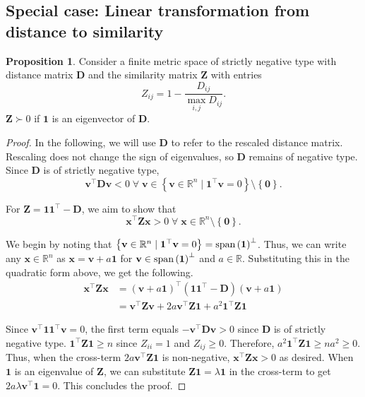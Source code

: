 \documentclass[aps,pre,floats,floatfix,superscriptaddress,twocolumn,final,10pt]{revtex4-2}
\theoremstyle{definition}
\newtheorem{proposition}{Proposition}
\renewcommand{\vec}[1]{\mathbf{#1}}
\begin{document}
\subsection{Special case: Linear transformation from distance to similarity}
\begin{proposition}
    Consider a finite metric space of strictly negative type with distance matrix $\vec{D}$ and the similarity matrix $\vec{Z}$ with entries 
    \begin{equation*}
        Z_{ij}=1-\frac{D_{ij}}{\max_{i,j}D_{ij}}.
    \end{equation*}
    $\vec{Z} \succ 0$ if $\vec{1}$ is an eigenvector of $\vec{D}$.
\label{prop:1-d}
\end{proposition}
\begin{proof}
In the following, we will use $\vec{D}$ to refer to the rescaled distance matrix. Rescaling does not change the sign of eigenvalues, so $\vec{D}$ remains of negative type. Since $\vec{D}$ is of strictly negative type,
\begin{equation}
    \vec{v}^\top \vec{Dv} < 0 \; \forall \; \vec{v} \in \left\{ \vec{v} \in \mathbb{R}^n \mid \vec{1}^\top\vec{v}=0 \right\} \setminus \left\{ \vec{0}\right\}.
\end{equation}

For $\vec{Z}=\vec{11}^\top - \vec{D}$, we aim to show that
\begin{equation}
    \vec{x}^\top \vec{Zx} > 0 \; \forall\; \vec{x} \in \mathbb{R}^n \setminus \left\{\vec{0}\right\}.
\end{equation}

We begin by noting that $\left\{ \vec{v} \in \mathbb{R}^n \mid \vec{1}^\top\vec{v}=0 \right\} = \textnormal{span}\left(\vec{1}\right)^\perp$. Thus, we can write any $\vec{x}\in\mathbb{R}^n$ as $\vec{x}=\vec{v} + a\vec{1}$ for $\vec{v}\in\textnormal{span}\left(\vec{1}\right)^\perp$ and $a\in\mathbb{R}$. Substituting this in the quadratic form above, we get the following.
\begin{align*}
    \vec{x}^\top \vec{Zx} &= \left( \vec{v} + a\vec{1}\right)^\top \left( \vec{11}^\top - \vec{D} \right) \left( \vec{v} + a\vec{1} \right)\\
    &= \vec{v}^\top \vec{Z} \vec{v} + 2a \vec{v}^\top\vec{Z} \vec{1} + a^2\vec{1}^\top \vec{Z} \vec{1}
\end{align*}

Since $\vec{v}^\top \vec{11}^\top \vec{v}=0$, the first term equals $-\vec{v}^\top \vec{D} \vec{v} > 0$ since $\vec{D}$ is of strictly negative type. $\vec{1}^\top \vec{Z} \vec{1} \geq n$ since $Z_{ii}=1$ and $Z_{ij}\geq 0$. Therefore, $a^2\vec{1}^\top \vec{Z} \vec{1} \geq na^2 \geq 0$. Thus, when the cross-term $2a \vec{v}^\top\vec{Z} \vec{1}$ is non-negative, $\vec{x}^\top \vec{Zx} > 0$ as desired. When $\vec{1}$ is an eigenvalue of $\vec{Z}$, we can substitute $\vec{Z1}=\lambda \vec{1}$ in the cross-term to get $2a\lambda \vec{v}^\top\vec{1} = 0$. This concludes the proof.
\end{proof}
\end{document}
